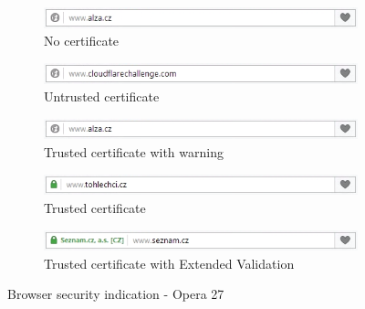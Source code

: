 \begin{figure}
  \begin{subfigure}[b]{\textwidth}
    \centering
    \includegraphics[scale=0.6]{images/browsers/o-none.png}
    \caption{No certificate}
  \end{subfigure}
  \begin{subfigure}[b]{\textwidth}
    \centering
    \includegraphics[scale=0.6]{images/browsers/o-untrusted.png}
    \caption{Untrusted certificate}
  \end{subfigure}
  \begin{subfigure}[b]{\textwidth}
    \centering
    \includegraphics[scale=0.6]{images/browsers/o-warning.png}
    \caption{Trusted certificate with warning}
  \end{subfigure}
  \begin{subfigure}[b]{\textwidth}
    \centering
    \includegraphics[scale=0.6]{images/browsers/o-dv.png}
    \caption{Trusted certificate}
  \end{subfigure}
  \begin{subfigure}[b]{\textwidth}
    \centering
    \includegraphics[scale=0.6]{images/browsers/o-ev.png}
    \caption{Trusted certificate with Extended Validation}
  \end{subfigure}
  \caption{Browser security indication - Opera 27}
\end{figure}


